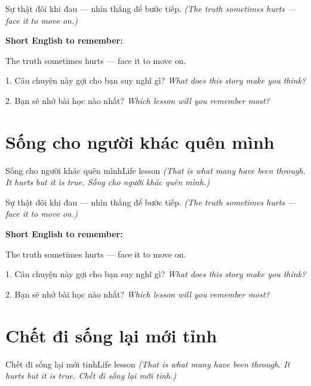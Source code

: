 \begin{baihoc}
Sự thật đôi khi đau — nhìn thẳng để bước tiếp.
\textit{(The truth sometimes hurts — face it to move on.)}
\end{baihoc}

\begin{ghinhoanh}
\textbf{Short English to remember:}

The truth sometimes hurts — face it to move on.

\end{ghinhoanh}

\begin{tuhocnhanh}
1. Câu chuyện này gợi cho bạn suy nghĩ gì? \textit{What does this story make you think?}

2. Bạn sẽ nhớ bài học nào nhất? \textit{Which lesson will you remember most?}
\end{tuhocnhanh}
\ngancach


\section{Sống cho người khác quên mình}
\begin{truyen}{Sống cho người khác quên mình}{Life lesson}
\textit{(That is what many have been through. It hurts but it is true. Sống cho người khác quên mình.)}
\end{truyen}

\begin{baihoc}
Sự thật đôi khi đau — nhìn thẳng để bước tiếp.
\textit{(The truth sometimes hurts — face it to move on.)}
\end{baihoc}

\begin{ghinhoanh}
\textbf{Short English to remember:}

The truth sometimes hurts — face it to move on.

\end{ghinhoanh}

\begin{tuhocnhanh}
1. Câu chuyện này gợi cho bạn suy nghĩ gì? \textit{What does this story make you think?}

2. Bạn sẽ nhớ bài học nào nhất? \textit{Which lesson will you remember most?}
\end{tuhocnhanh}
\ngancach


\section{Chết đi sống lại mới tỉnh}
\begin{truyen}{Chết đi sống lại mới tỉnh}{Life lesson}
\textit{(That is what many have been through. It hurts but it is true. Chết đi sống lại mới tỉnh.)}
\end{truyen}

